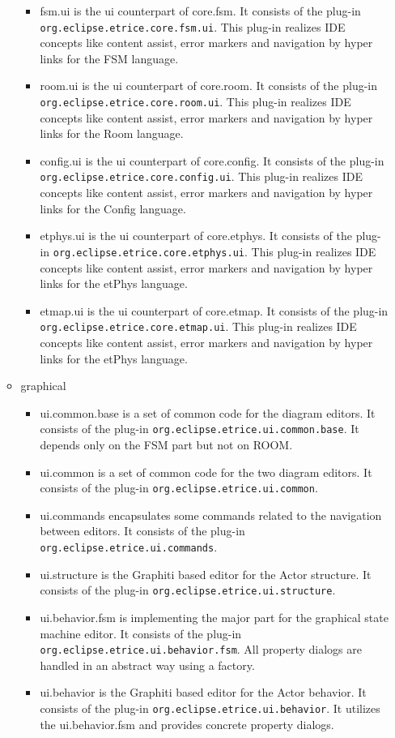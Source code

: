 \begin{itemize}
\begin{itemize}
\begin{itemize}
\item fsm.ui is the ui counterpart of core.fsm.  It consists of the plug-in 
\texttt{org.eclipse.etrice.core.fsm.ui}. This plug-in realizes IDE concepts like content assist, error 
markers and navigation by hyper links for the FSM language.
\item room.ui is the ui counterpart of core.room.  It consists of the plug-in 
\texttt{org.eclipse.etrice.core.room.ui}. This plug-in realizes IDE concepts like content assist, error 
markers and navigation by hyper links for the Room language.
\item config.ui is the ui counterpart of core.config.  It consists of the plug-in 
\texttt{org.eclipse.etrice.core.config.ui}. This plug-in realizes IDE concepts like content assist, error 
markers and navigation by hyper links for the Config language.
\item etphys.ui is the ui counterpart of core.etphys.  It consists of the plug-in 
\texttt{org.eclipse.etrice.core.etphys.ui}. This plug-in realizes IDE concepts like content assist, error 
markers and navigation by hyper links for the etPhys language.
\item etmap.ui is the ui counterpart of core.etmap.  It consists of the plug-in 
\texttt{org.eclipse.etrice.core.etmap.ui}. This plug-in realizes IDE concepts like content assist, error 
markers and navigation by hyper links for the etPhys language.
\end{itemize}

\item graphical
\begin{itemize}
\item ui.common.base is a set of common code for the diagram editors. It consists of the plug-in 
\texttt{org.eclipse.etrice.ui.common.base}. It depends only on the FSM part but not on ROOM.
\item ui.common is a set of common code for the two diagram editors. It consists of the plug-in 
\texttt{org.eclipse.etrice.ui.common}.
\item ui.commands encapsulates some commands related to the navigation between \eTrice{} editors. It consists 
of the plug-in \texttt{org.eclipse.etrice.ui.commands}.
\item ui.structure is the Graphiti based editor for the Actor structure. It consists of the plug-in 
\texttt{org.eclipse.etrice.ui.structure}.
\item ui.behavior.fsm is implementing the major part for the graphical state machine editor. It consists of the plug-in 
\texttt{org.eclipse.etrice.ui.behavior.fsm}. All property dialogs are handled in an abstract way
using a factory.
\item ui.behavior is the Graphiti based editor for the Actor behavior. It consists of the plug-in 
\texttt{org.eclipse.etrice.ui.behavior}. It utilizes the ui.behavior.fsm and provides concrete property dialogs.
\end{itemize}
\end{itemize}


\end{itemize}
